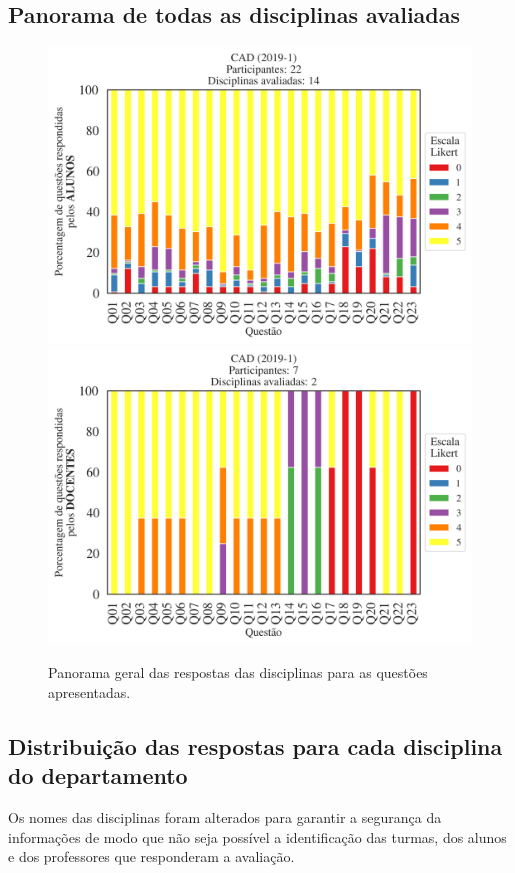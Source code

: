 \documentclass[a4paper,10pt]{article}
\begin{document}
\subsection{Panorama de todas as disciplinas avaliadas}
\begin{figure}[h]
\centering
\includegraphics[width=0.85\linewidth]{analise_geral_departamento_CAD_ALUNO_TURMA.png}
\includegraphics[width=0.85\linewidth]{analise_geral_departamento_CAD_DOCENTE_TURMA.png}
\caption{\label{fig:analise_geral_departamento}            Panorama geral das respostas das disciplinas para as questões apresentadas.}
\end{figure}
\subsection{Distribuição das respostas para cada disciplina do departamento}

Os nomes das disciplinas foram alterados para garantir a segurança da informações de modo que não seja possível a identificação das turmas, dos alunos  e dos professores que responderam a avaliação.
\end{document}
